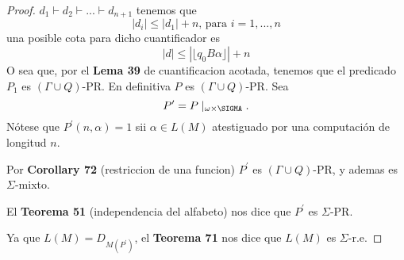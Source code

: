 \begin{proof}
    \noindent \(d_{1}\vdash d_{2}\vdash ...\vdash d_{n+1}\) tenemos que
    \[
      \displaystyle \left\vert d_{i}\right\vert \leq \left\vert d_{1}\right\vert +n\text{, para } i=1,...,n
    \]
    una posible cota para dicho cuantificador es
    \[
      |d| \leq |\lfloor q_{0}B\alpha \rfloor| + n
    \]
    O sea que, por el \textbf{Lema 39} de cuantificacion acotada, tenemos que el predicado $P_1$ es
    $(\Gamma \cup Q)$-PR. En definitiva $P$ es $(\Gamma \cup Q)$-PR.
    Sea
    \[
      P^{\prime }=P\mid _{\omega \times \SIGMA}.
    \]
    Nótese que $P^{\prime }(n,\alpha )=1$ sii
    $\alpha \in L(M) $ atestiguado por una computación de longitud $n$.

    \noindent Por \textbf{Corollary 72} (restriccion de una funcion) $P^{\prime }$ es $(\Gamma \cup Q)$-PR,
    y ademas es $\Sigma $-mixto.

    \noindent El \textbf{Teorema 51} (independencia del alfabeto) nos dice que $P^{\prime }$ es $\Sigma $-PR.

    \noindent Ya que $ L(M)=D_{M(P^{\prime })}$, el \textbf{Teorema 71} nos dice que $ L(M)$ es $\Sigma $-r.e.
  \end{proof}

